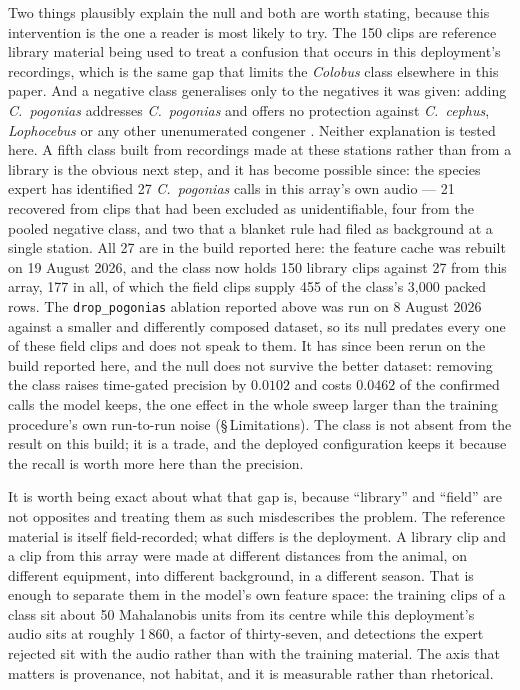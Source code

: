 \documentclass[review,3p,times]{elsarticle}
\begin{document}
Two things plausibly explain the null and both are worth stating, because this
intervention is the one a reader is most likely to try. The 150 clips are
reference library material being used to treat a confusion that occurs in this
deployment's recordings, which is the same gap that limits the \textit{Colobus}
class elsewhere in this paper. And a negative class generalises only to the
negatives it was given: adding \textit{C.\ pogonias} addresses \textit{C.\
pogonias} and offers no protection against \textit{C.\ cephus},
\textit{Lophocebus} or any other unenumerated congener \cite{bisgin2024}. Neither
explanation is tested here. A fifth class built from recordings made at these
stations rather than from a library is the obvious next step, and it has become
possible since: the species expert has identified 27 \textit{C.\ pogonias} calls
in this array's own audio --- 21 recovered from clips that had been excluded as
unidentifiable, four from the pooled negative class, and two that a blanket rule
had filed as background at a single station. All 27 are in the build reported
here: the feature cache was rebuilt on 19 August 2026, and the class now holds
150 library clips against 27 from this array, 177 in all, of which the field
clips supply 455 of the class's 3{,}000 packed rows. The \texttt{drop\_pogonias} ablation reported above was run on 8 August 2026
against a smaller and differently composed dataset, so its null predates every
one of these field clips and does not speak to them. It has since been rerun on
the build reported here, and the null does not survive the better dataset:
removing the class raises time-gated precision by $0.0102$ and costs $0.0462$ of
the confirmed calls the model keeps, the one effect in the whole sweep larger
than the training procedure's own run-to-run noise (\S\,Limitations). The class
is not absent from the result on this build; it is a trade, and the deployed
configuration keeps it because the recall is worth more here than the
precision.

It is worth being exact about what that gap is, because ``library'' and
``field'' are not opposites and treating them as such misdescribes the problem.
The reference material is itself field-recorded; what differs is the deployment.
A library clip and a clip from this array were made at different distances from
the animal, on different equipment, into different background, in a different
season. That is enough to separate them in the model's own feature space: the
training clips of a class sit about 50 Mahalanobis units from its centre while
this deployment's audio sits at roughly 1\,860, a factor of thirty-seven, and
detections the expert rejected sit with the audio rather than with the training
material. The axis that matters is provenance, not habitat, and it is measurable
rather than rhetorical.
\end{document}
